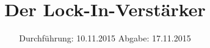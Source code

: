 

\subject{V303}
\title{Der Lock-In-Verstärker}
\date{
  Durchführung: 10.11.2015
  \hspace{3em}
  Abgabe: 17.11.2015
}



\maketitle
\thispagestyle{empty}
\tableofcontents
\newpage






\printbibliography


